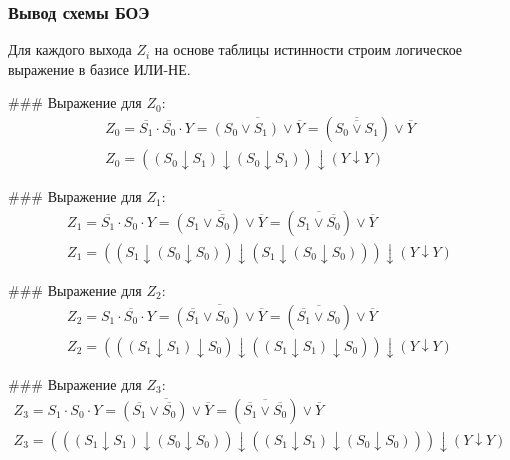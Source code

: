 
\subsubsection{Вывод схемы БОЭ}

Для каждого выхода \( Z_i \) на основе таблицы истинности строим логическое выражение в базисе ИЛИ-НЕ.

### Выражение для \( Z_0 \):
\[
	\begin{gathered}
		Z_0 = \overline{S_1} \cdot \overline{S_0} \cdot Y = \overline{(S_0 \vee S_1) \vee \overline{Y}} = (\overline{\overline{S_0 \vee S_1}}) \vee \overline{Y} \\
		Z_0 = ((S_0 \downarrow S_1) \downarrow (S_0 \downarrow S_1)) \downarrow (Y \downarrow Y)
	\end{gathered}
\]

### Выражение для \( Z_1 \):
\[
	\begin{gathered}
		Z_1 = \overline{S_1} \cdot S_0 \cdot Y = \overline{(S_1 \vee \overline{S_0}) \vee \overline{Y}} = (\overline{S_1 \vee \overline{S_0}}) \vee \overline{Y} \\
		Z_1 = ((S_1 \downarrow (S_0 \downarrow S_0)) \downarrow (S_1 \downarrow (S_0 \downarrow S_0))) \downarrow (Y \downarrow Y)
	\end{gathered}
\]

### Выражение для \( Z_2 \):
\[
	\begin{gathered}
		Z_2 = S_1 \cdot \overline{S_0} \cdot Y = \overline{(\overline{S_1} \vee S_0) \vee \overline{Y}} = (\overline{\overline{S_1} \vee S_0}) \vee \overline{Y} \\
		Z_2 = (((S_1 \downarrow S_1) \downarrow S_0) \downarrow ((S_1 \downarrow S_1) \downarrow S_0)) \downarrow (Y \downarrow Y)
	\end{gathered}
\]

### Выражение для \( Z_3 \):
\[
	\begin{gathered}
		Z_3 = S_1 \cdot S_0 \cdot Y = \overline{(\overline{S_1} \vee \overline{S_0}) \vee \overline{Y}} = (\overline{\overline{S_1} \vee \overline{S_0}}) \vee \overline{Y} \\
		Z_3 = (((S_1 \downarrow S_1) \downarrow (S_0 \downarrow S_0)) \downarrow ((S_1 \downarrow S_1) \downarrow (S_0 \downarrow S_0))) \downarrow (Y \downarrow Y)
	\end{gathered}
\]

